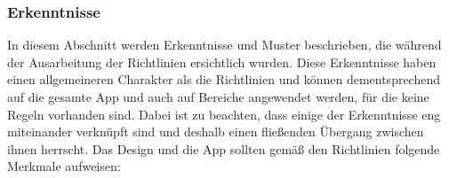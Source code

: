 \subsubsection{Erkenntnisse}\label{subsection:design:erkenntnisse}%
In diesem Abschnitt werden Erkenntnisse und Muster beschrieben, die während der Ausarbeitung der Richtlinien ersichtlich wurden.\newline%
Diese Erkenntnisse haben einen allgemeineren Charakter als die Richtlinien und können dementsprechend auf die gesamte App und auch auf Bereiche angewendet werden, für die keine Regeln vorhanden sind.\newline%
Dabei ist zu beachten, dass einige der Erkenntnisse eng miteinander verknüpft sind und deshalb einen fließenden Übergang zwischen ihnen herrscht.%
%
\newline
\myNewSection
Das Design und die App sollten gemäß den Richtlinien folgende Merkmale aufweisen:
